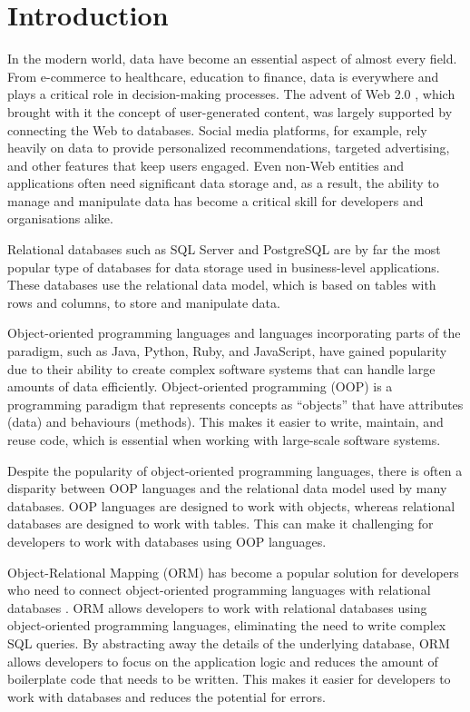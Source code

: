 \chapter{Introduction}

In the modern world, data have become an essential aspect of almost every field.
From e-commerce to healthcare, education to finance, data is everywhere and
plays a critical role in decision-making processes. The advent of Web
2.0 \cite{Web2Oreilly}, which brought with it the concept of user-generated
content, was largely supported by connecting the Web to databases. Social media
platforms, for example, rely heavily on data to provide personalized
recommendations, targeted advertising, and other features that keep users
engaged. Even non-Web entities and applications often need significant data
storage and, as a result, the ability to manage and manipulate data has become a
critical skill for developers and organisations alike.

Relational databases such as SQL Server and PostgreSQL are by far the most
popular type of databases for data storage used in business-level applications.
These databases use the relational data model, which is based on tables with
rows and columns, to store and manipulate data.

Object-oriented programming languages and languages incorporating parts of the
paradigm, such as Java, Python, Ruby, and JavaScript, have gained
popularity \cite{stack-overflow-survey} due to their ability to create complex
software systems that can handle large amounts of data efficiently.
Object-oriented programming (OOP) is a programming paradigm that represents
concepts as \enquote{objects} that have attributes (data) and behaviours
(methods). This makes it easier to write, maintain, and reuse code, which is
essential when working with large-scale software systems.

Despite the popularity of object-oriented programming languages, there is often
a disparity between OOP languages and the relational data model used by many
databases. OOP languages are designed to work with objects, whereas relational
databases are designed to work with tables. This can make it challenging for
developers to work with databases using OOP languages. 

Object-Relational Mapping (ORM) has become a popular solution for developers who
need to connect object-oriented programming languages with relational databases
\cite{Torres_Galante_Pimenta_Martins_2017}. ORM allows developers to work with
relational databases using object-oriented programming languages, eliminating
the need to write complex SQL queries. By abstracting away the details of the
underlying database, ORM allows developers to focus on the application logic and
reduces the amount of boilerplate code that needs to be written. This makes it
easier for developers to work with databases and reduces the potential for
errors. 

